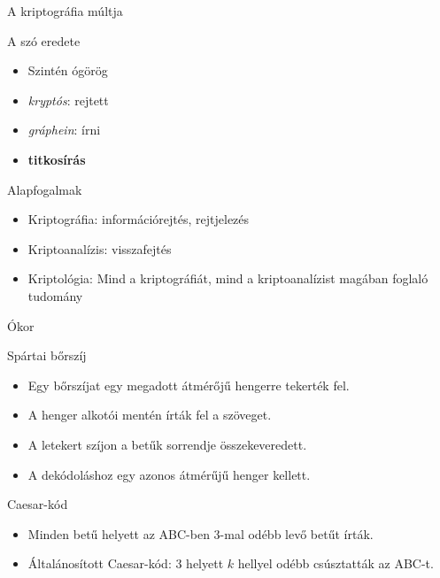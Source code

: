 \documentclass[12 pt]{beamer}
\begin{document}
\begin{frame}{A kriptográfia múltja}
  \begin{block}{A szó eredete}
    \begin{itemize}
      \item{Szintén ógörög}
      \item{\textit{kryptós}: rejtett}
      \item{\textit{gráphein}: írni}
      \item{\textbf{titkosírás}}
    \end{itemize}
  \end{block}

  \begin{block}{Alapfogalmak}
    \begin{itemize}
      \item{Kriptográfia: információrejtés, rejtjelezés}
      \item{Kriptoanalízis: visszafejtés}
      \item{Kriptológia: Mind a kriptográfiát, mind a kriptoanalízist magában foglaló tudomány}
    \end{itemize}
  \end{block}

\end{frame}


\begin{frame}{Ókor}
  \begin{block}{Spártai bőrszíj}
    \begin{itemize}
      \item{Egy bőrszíjat egy megadott átmérőjű hengerre tekerték fel.}
      \item{A henger alkotói mentén írták fel a szöveget.}
      \item{A letekert szíjon a betűk sorrendje összekeveredett.}
      \item{A dekódoláshoz egy azonos átmérűjű henger kellett.}
    \end{itemize}
  \end{block}

  \begin{block}{Caesar-kód}
    \begin{itemize}
      \item{Minden betű helyett az ABC-ben 3-mal odébb levő betűt írták.}
      \item{Általánosított Caesar-kód: 3 helyett $k$ hellyel odébb csúsztatták az ABC-t.}
    \end{itemize}
  \end{block}

\end{frame}
\end{document}
